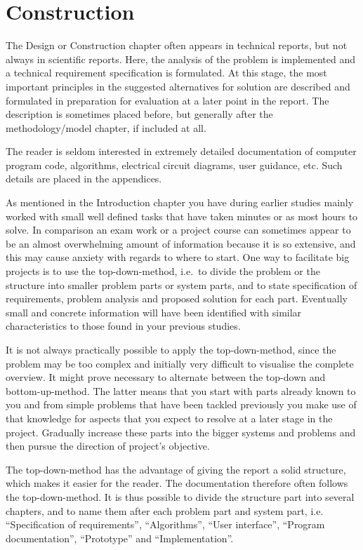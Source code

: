\section{Construction}\label{sec:construction}
The Design or Construction chapter often appears in technical reports, but not
always in scientific reports. Here, the analysis of the problem is implemented
and a technical requirement specification is formulated. At this stage, the most
important principles in the suggested alternatives for solution are described
and formulated in preparation for evaluation at a later point in the report. The
description is sometimes placed before, but generally after the
methodology/model chapter, if included at all.

The reader is seldom interested in extremely detailed documentation of computer
program code, algorithms, electrical circuit diagrams, user guidance, etc. Such
details are placed in the appendices.

As mentioned in the Introduction chapter you have during earlier studies mainly
worked with small well defined tasks that have taken minutes or as most hours to
solve. In comparison an exam work or a project course can sometimes appear to be
an almost overwhelming amount of information because it is so extensive, and
this may cause anxiety with regards to where to start. One way to facilitate big
projects is to use the top-down-method, i.e.\ to divide the problem or the
structure into smaller problem parts or system parts, and to state specification
of  requirements, problem analysis and proposed solution for each part.
Eventually small and concrete information will have been identified with similar
characteristics to those found in your previous studies.

It is not always practically possible to apply the top-down-method, since the
problem may be too complex and initially very difficult to visualise the
complete overview. It might prove necessary to alternate between the top-down 
and bottom-up-method. The latter means that you start with parts already known
to you and from simple problems that have been tackled previously you  make use
of that knowledge for aspects that you expect to resolve at a later stage in the
project. Gradually increase these parts into the bigger systems and problems and
then pursue the direction of project's objective.

The top-down-method has the advantage of giving the report a solid structure,
which makes it easier for the reader. The documentation therefore often follows
the top-down-method. It is thus possible to divide the structure part into
several chapters, and to name them after each problem part and system part, i.e.
``Specification of requirements'', ``Algorithms'', ``User interface'', ``Program
documentation'', ``Prototype'' and ``Implementation''.
